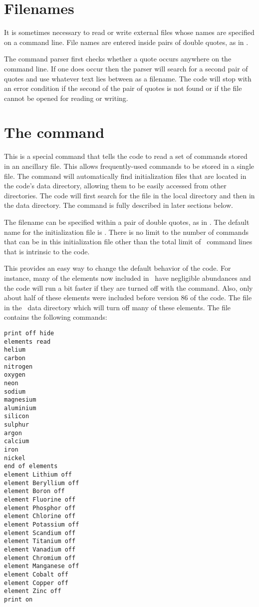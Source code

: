 \section{Filenames}

It is sometimes necessary to read or write external files whose names
are specified on a command line.  File names are entered inside pairs of
double quotes, as in .

The command parser first checks whether a quote occurs anywhere on the
command line.  If one does occur then the parser will search for a second
pair of quotes and use whatever text lies between as a filename.  The code
will stop with an error condition if the second of the pair of quotes is
not found or if the file cannot be opened for reading or writing.

\section{The  command}

\noindent
This is a special command that tells the code to read a set of commands
stored in an ancillary file.  This allows frequently-used commands to be
stored in a single file.
The  command will automatically find
initialization files that are located in the code's
data directory, allowing
them to be easily accessed from other directories.
The code will first
search for the file in the local directory and then
in the data directory.
The  command is fully described in later sections below.

The filename can be specified within a pair of double quotes, as in
.
The default name for the initialization file is
.
There is no limit to the number of commands that can be in this
initialization file other than the total limit of \NKRD\ command lines that
is intrinsic to the code.

This provides an easy way to change the default behavior of the code.
For instance, many of the elements now included in \Cloudy\ have
negligible abundances and the code will run a bit faster
if they are turned off with
the  command.
Also, only about half of these
elements were included before version 86 of the code.
The file  in the \Cloudy\ data directory
which will turn off many of these elements.
The  file contains
the following commands:
\begin{verbatim}
print off hide
elements read
helium
carbon
nitrogen
oxygen
neon
sodium
magnesium
aluminium
silicon
sulphur
argon
calcium
iron
nickel
end of elements
element Lithium off
element Beryllium off
element Boron off
element Fluorine off
element Phosphor off
element Chlorine off
element Potassium off
element Scandium off
element Titanium off
element Vanadium off
element Chromium off
element Manganese off
element Cobalt off
element Copper off
element Zinc off
print on
\end{verbatim}

